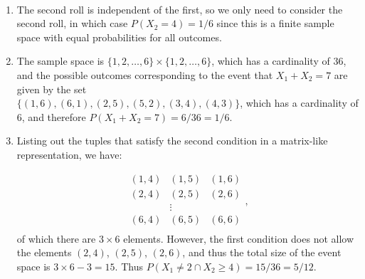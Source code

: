   \begin{problem}{15} $ $
	\begin{enumerate}
		
		\item The second roll is independent of the first, so we only need to consider the second roll, in which case $P(X_2 = 4) = 1/6$ since this is a finite sample space with equal probabilities for all outcomes.
		
	\item The sample space is $\{1, 2, \ldots, 6 \} \times \{1, 2, \ldots, 6 \}$, which has a cardinality of 36, and the possible outcomes corresponding to the event that $X_1 +X_2 = 7$ are given by the set \\
	$\{ (1, 6), (6, 1), (2, 5), (5, 2), (3, 4), (4, 3) \}$, which has a cardinality of 6, and therefore $P(X_1+X_2 = 7) = 6/36=1/6$.
		
		\item Listing out the tuples that satisfy the second condition in a matrix-like representation, we have: 
		
			\begin{equation*}
				\begin{array}{ccc}
					(1, 4) & (1, 5)& (1, 6) \\
					(2, 4) & (2, 5)& (2, 6) \\
 					& \vdots & \\
					(6, 4) & (6, 5) & (6, 6) \\
				\end{array},
			\end{equation*}
of which there are $3\times 6$ elements.  However, the first condition does not allow the elements $(2, 4)$, $(2, 5)$, $(2, 6)$, and thus the total size of the event space is  $3\times 6-3 =15$.  Thus $P(X_1 \ne 2 \cap X_2 \ge 4) = 15/36=5/12$.
	
  
 	\end{enumerate}
\end{problem} 


